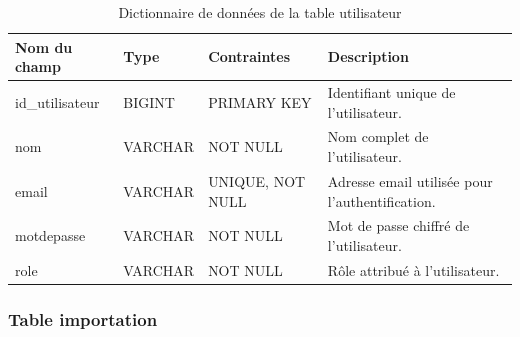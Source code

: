 \begin{table}[H]
	\centering
	\footnotesize
	
	\begin{tabularx}{\textwidth}{|p{3cm}|p{2.5cm}|p{3.5cm}|X|}
		\hline
		
		\rowcolor{blue!20}
		\textbf{Nom du champ}
		&
		\textbf{Type}
		&
		\textbf{Contraintes}
		&
		\textbf{Description}
		\\ \hline
		
		id\_utilisateur
		&
		BIGINT
		&
		PRIMARY KEY
		&
		Identifiant unique de l’utilisateur.
		\\ \hline
		
		nom
		&
		VARCHAR
		&
		NOT NULL
		&
		Nom complet de l’utilisateur.
		\\ \hline
		
		email
		&
		VARCHAR
		&
		UNIQUE, NOT NULL
		&
		Adresse email utilisée pour l’authentification.
		\\ \hline
		
		motdepasse
		&
		VARCHAR
		&
		NOT NULL
		&
		Mot de passe chiffré de l’utilisateur.
		\\ \hline
		
		role
		&
		VARCHAR
		&
		NOT NULL
		&
		Rôle attribué à l’utilisateur.
		\\ \hline
		
	\end{tabularx}
	
	\caption{Dictionnaire de données de la table utilisateur}
	\label{tab:user_table}
	
\end{table}



\subsubsection{Table importation}

